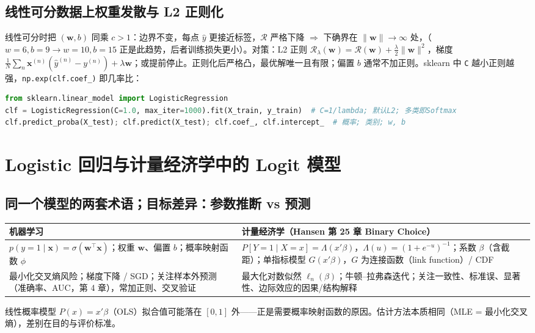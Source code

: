 \subsection{线性可分数据上权重发散与 L2 正则化}
线性可分时把 $(\bm w,b)$ 同乘 $c>1$：边界不变，每点 $\hat y$ 更接近标签，$\mathcal R$ 严格下降 $\Rightarrow$ 下确界在 $\|\bm w\|\to\infty$ 处，（$w=6,b=9\to w=10,b=15$ 正是此趋势，后者训练损失更小）。对策：L2 正则 $\mathcal R_\lambda(\bm w)=\mathcal R(\bm w)+\frac\lambda2\|\bm w\|^2$，梯度 $\frac1N\sum_n\bm x^{(n)}(\hat y^{(n)}-y^{(n)})+\lambda\bm w$；或提前停止。正则化后严格凸，最优解唯一且有限；偏置 $b$ 通常不加正则。sklearn 中 \texttt{C} 越小正则越强，\texttt{np.exp(clf.coef\_)} 即几率比：
\begin{lstlisting}[language=Python]
from sklearn.linear_model import LogisticRegression
clf = LogisticRegression(C=1.0, max_iter=1000).fit(X_train, y_train)  # C=1/lambda; 默认L2; 多类即Softmax
clf.predict_proba(X_test); clf.predict(X_test); clf.coef_, clf.intercept_  # 概率; 类别; w, b
\end{lstlisting}

\section{Logistic 回归与计量经济学中的 Logit 模型 \tagext}

\subsection{同一个模型的两套术语；目标差异：参数推断 vs 预测}
\begin{center}\small
\begin{tabularx}{\linewidth}{@{}LL@{}}
\toprule
机器学习 & 计量经济学（Hansen 第 25 章 Binary Choice）\\
\midrule
$p(y=1\mid\bm x)=\sigma(\bm w^\top\bm x)$；权重 $\bm w$、偏置 $b$；概率映射函数 $\phi$ & $P[Y=1\mid X=x]=\Lambda(x'\beta)$，$\Lambda(u)=(1+e^{-u})^{-1}$；系数 $\beta$（含截距）；单指标模型 $G(x'\beta)$，$G$ 为连接函数（link function）/ CDF \\
最小化交叉熵风险；梯度下降 / SGD；关注样本外预测（准确率、AUC，第 4 章），常加正则、交叉验证 & 最大化对数似然 $\ell_n(\beta)$；牛顿–拉弗森迭代；关注一致性、标准误、显著性、边际效应的因果/结构解释 \\
\bottomrule
\end{tabularx}
\end{center}
线性概率模型 $P(x)=x'\beta$（OLS）拟合值可能落在 $[0,1]$ 外——正是需要概率映射函数的原因。估计方法本质相同（MLE = 最小化交叉熵），差别在目的与评价标准。


